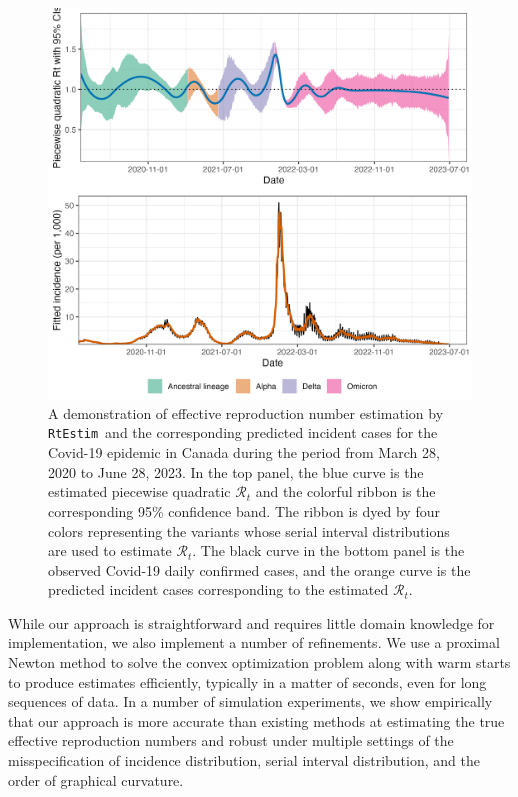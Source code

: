 \documentclass[10pt,letterpaper]{article}
\def\RtEstim{\texttt{RtEstim}}
\def\calR{\mathcal{R}}
\begin{document}
\begin{figure}[!ht]
  \centering
  \includegraphics[width=.9\textwidth]{fig/intro-fig-new.png}
  \caption{A demonstration of effective reproduction number estimation 
  by \RtEstim\ and the corresponding predicted incident cases for the Covid-19 epidemic 
  in Canada during the period from March 28, 2020 to June 28, 2023. 
  In the top panel, the blue curve is the estimated piecewise
  quadratic $\calR_t$ and the colorful ribbon is the corresponding 95\% confidence band. 
  The ribbon is dyed by four colors representing the variants whose serial interval distributions
  are used to estimate $\calR_t$.
  The black curve in the bottom panel is the observed Covid-19 daily confirmed 
  cases, and the orange curve is the predicted incident cases
  corresponding to the estimated $\calR_t$. }
  \label{fig:intro-fig}
\end{figure}

While our approach is straightforward and requires little domain knowledge for
implementation, we also implement a number of refinements. 
We use a proximal Newton method to solve the convex optimization problem along
with warm starts to produce estimates efficiently, typically in a matter of 
seconds, even for long sequences of data. In a number of simulation experiments, 
we show empirically that our approach is more accurate than existing methods at 
estimating the true effective reproduction numbers and robust under multiple 
settings of the misspecification of incidence distribution, serial interval 
distribution, and the order of graphical curvature. 
\end{document}
